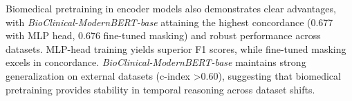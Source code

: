 Biomedical pretraining in encoder models also demonstrates clear advantages, with \textit{BioClinical-ModernBERT-base} attaining the highest concordance (0.677 with MLP head, 0.676 fine-tuned masking) and robust performance across datasets. MLP-head training yields superior F1 scores, while fine-tuned masking excels in concordance. \textit{BioClinical-ModernBERT-base} maintains strong generalization on external datasets (c-index \textgreater0.60), suggesting that biomedical pretraining provides stability in temporal reasoning across dataset shifts.





